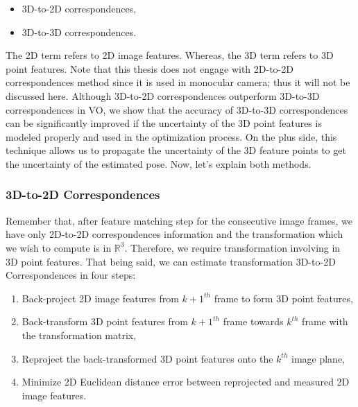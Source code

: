 \documentclass[a4paper]{report}
\numberwithin{figure}{section}
\newcommand{\R}{\mathbb{R}}
\begin{document}
\begin{itemize}
  \item 3D-to-2D correspondences,
  \item 3D-to-3D correspondences.
\end{itemize}


The 2D term refers to 2D image features. Whereas, the 3D term refers to 3D 
point features.  Note that this thesis does not engage with 2D-to-2D 
correspondences method since it is used in monocular camera; thus it will not 
be discussed here. Although 3D-to-2D 
correspondences outperform 3D-to-3D correspondences in VO, we show that the 
accuracy of 3D-to-3D correspondences can be significantly improved if the 
uncertainty of the 3D point features is modeled properly and used in the 
optimization process.  On the plus side, this technique allows us to propagate 
the uncertainty of the 3D feature points to get the uncertainty of the 
estimated 
pose. Now, let's explain both methods.


\subsubsection{3D-to-2D Correspondences}\label{sb_sc_3d_to_2d}

Remember that, after feature matching step for the consecutive image frames, 
we have only 2D-to-2D correspondences information and the transformation which 
we wish to compute is in $\R^3$. Therefore, we require transformation 
involving in 3D point features. That being said, we can estimate 
transformation 3D-to-2D Correspondences in four steps:

\begin{enumerate}
  \item Back-project 2D image features from $k+1^{th}$ frame to form 3D point features,
  \item Back-transform 3D point features from $k+1^{th}$ frame towards $k^{th}$ frame 
    with the transformation matrix,
  \item Reproject the back-transformed 3D point features onto the $k^{th}$ image plane, 
  \item Minimize 2D Euclidean distance error between reprojected and measured 2D image features.
\end{enumerate}
\end{document}

